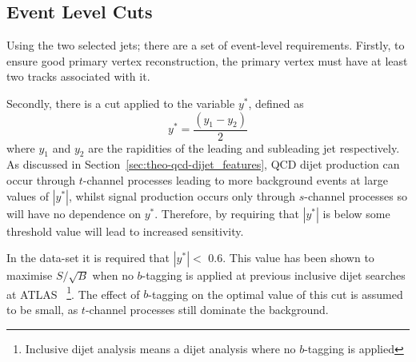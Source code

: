 
\subsection{Event Level Cuts}
\label{sec:evt-sel-event}

Using the two selected jets; there are a set of event-level requirements.
Firstly, to ensure good primary vertex reconstruction,
the primary vertex must have at least two tracks associated with it.

\noindent
Secondly, there is a cut applied to the variable $y^*$, defined as
\begin{equation}
  y^* = \frac{(y_1-y_2)}{2}
\end{equation}
where $y_1$ and $y_2$ are the rapidities of the leading and subleading jet respectively.
As discussed in Section~\ref{sec:theo-qcd-dijet_features}, QCD dijet production can occur through $t$-channel processes leading to more background events at large values of $|y^*|$,
whilst signal production occurs only through $s$-channel processes so will have no dependence on $y^*$.
Therefore, by requiring that $|y^*|$ is below some threshold value will lead to increased sensitivity.

In the \summer{} data-set it is required that $|y^*| <$ 0.6.
This value has been shown to maximise $S/\sqrt{B}$ when no $b$-tagging is applied
at previous inclusive dijet searches at ATLAS~\cite{dijet-mori16_paper}
\footnote{Inclusive dijet analysis means a dijet analysis where no $b$-tagging is applied}.
The effect of $b$-tagging on the optimal value of this cut is assumed to be small,
as $t$-channel processes still dominate the background.

